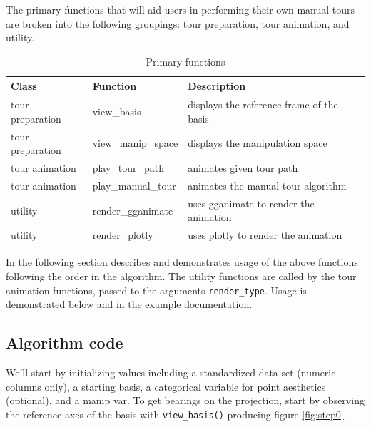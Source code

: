 The primary functions that will aid users in performing their own manual
tours are broken into the following groupings: tour preparation, tour
animation, and utility.

\begin{Schunk}
\begin{table}[t]

\caption{\label{tab:functionsTable}Primary functions}
\centering
\begin{tabular}{lll}
\toprule
Class & Function & Description\\
\midrule
tour preparation & view\_basis & displays the reference frame of the basis\\
tour preparation & view\_manip\_space & displays the manipulation space\\
tour animation & play\_tour\_path & animates given tour path\\
tour animation & play\_manual\_tour & animates the manual tour algorithm\\
utility & render\_gganimate & uses gganimate to render the animation\\
\addlinespace
utility & render\_plotly & uses plotly to render the animation\\
\bottomrule
\end{tabular}
\end{table}

\end{Schunk}

In the following section describes and demonstrates usage of the above
functions following the order in the algorithm. The utility functions
are called by the tour animation functions, passed to the arguments
\texttt{render\_type}. Usage is demonstrated below and in the example
documentation.

\hypertarget{algorithm-code}{%
\subsection{Algorithm code}\label{algorithm-code}}

We'll start by initializing values including a standardized data set
(numeric columns only), a starting basis, a categorical variable for
point aesthetics (optional), and a manip var. To get bearings on the
projection, start by observing the reference axes of the basis with
\texttt{view\_basis()} producing figure \ref{fig:step0}.

\begin{Schunk}
\end{Schunk}

